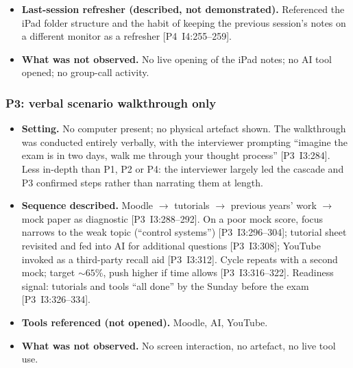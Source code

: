 \documentclass[a4paper,11pt]{article}
\begin{document}
\begin{itemize}[leftmargin=1.2em,itemsep=2pt]
          group call [P4~I4:317]. YouTube use: ``not usually about
          solving problems\dots\ for understanding the topic''
          [P4~I4:325--329]. Cascade: lecture $\rightarrow$ topic
          $\rightarrow$ YouTube $\rightarrow$ tutorial [P4~I4:341].
    \item \textbf{Last-session refresher (described, not
          demonstrated).} Referenced the iPad folder structure and the
          habit of keeping the previous session's notes on a different
          monitor as a refresher [P4~I4:255--259].
    \item \textbf{What was not observed.} No live opening of the iPad
          notes; no AI tool opened; no group-call activity.
\end{itemize}

\subsubsection*{P3: verbal scenario walkthrough only}\label{app:obs-p3}
\begin{itemize}[leftmargin=1.2em,itemsep=2pt]
    \item \textbf{Setting.} No computer present; no physical artefact
          shown. The walkthrough was conducted entirely verbally, with
          the interviewer prompting ``imagine the exam is in two days,
          walk me through your thought process'' [P3~I3:284]. Less
          in-depth than P1, P2 or P4: the interviewer largely led the
          cascade and P3 confirmed steps rather than narrating them at
          length.
    \item \textbf{Sequence described.} Moodle $\rightarrow$ tutorials
          $\rightarrow$ previous years' work $\rightarrow$ mock paper
          as diagnostic [P3~I3:288--292]. On a poor mock score, focus
          narrows to the weak topic (``control systems'')
          [P3~I3:296--304]; tutorial sheet revisited and fed into AI
          for additional questions [P3~I3:308]; YouTube invoked as a
          third-party recall aid [P3~I3:312]. Cycle repeats with a
          second mock; target ${\sim}65$\%, push higher if time allows
          [P3~I3:316--322]. Readiness signal: tutorials and tools
          ``all done'' by the Sunday before the exam
          [P3~I3:326--334].
    \item \textbf{Tools referenced (not opened).} Moodle, AI, YouTube.
    \item \textbf{What was not observed.} No screen interaction, no
          artefact, no live tool use.
\end{itemize}
\end{document}
